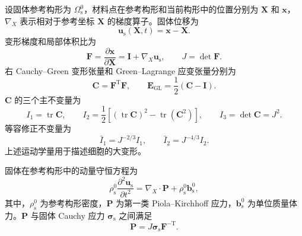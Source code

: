 设固体参考构形为 $\Omega_{\mathrm s}^0$，材料点在参考构形和当前构形中的位置分别为 $\boldsymbol{X}$ 和 $\boldsymbol{x}$，$\nabla_{\!X}$ 表示相对于参考坐标 $\boldsymbol{X}$ 的梯度算子。固体位移为
\begin{equation}
\boldsymbol{u}_{\mathrm s}(\boldsymbol{X},t)
=
\boldsymbol{x}-\boldsymbol{X}.
\label{eq:ch2_solid_motion}
\end{equation}
变形梯度和局部体积比为
\begin{equation}
\boldsymbol{F}
=
\frac{\partial\boldsymbol{x}}{\partial\boldsymbol{X}}
=
\boldsymbol{I}
+
\nabla_{\!X}\boldsymbol{u}_{\mathrm s},
\qquad
J=\det\boldsymbol{F}.
\label{eq:ch2_deformation_gradient}
\end{equation}
右 Cauchy--Green 变形张量和 Green--Lagrange 应变张量分别为
\begin{equation}
\boldsymbol{C}
=
\boldsymbol{F}^{\mathrm T}\boldsymbol{F},
\qquad
\boldsymbol{E}_{\mathrm{GL}}
=
\frac{1}{2}\left(\boldsymbol{C}-\boldsymbol{I}\right).
\label{eq:ch2_strain_tensors}
\end{equation}
$\boldsymbol{C}$ 的三个主不变量为
\begin{equation}
I_1=\operatorname{tr}\boldsymbol{C},
\qquad
I_2=
\frac{1}{2}
\left[
\left(\operatorname{tr}\boldsymbol{C}\right)^2
-
\operatorname{tr}\left(\boldsymbol{C}^2\right)
\right],
\qquad
I_3=\det\boldsymbol{C}=J^2.
\label{eq:ch2_invariants}
\end{equation}
等容修正不变量为
\begin{equation}
\bar I_1=J^{-2/3}I_1,
\qquad
\bar I_2=J^{-4/3}I_2.
\label{eq:ch2_modified_invariants}
\end{equation}
上述运动学量用于描述细胞的大变形\cite{holzapfel2000nonlinear,ogden1997nonlinear,bonet2008nonlinear}。

固体在参考构形中的动量守恒方程为
\begin{equation}
\rho_{\mathrm s}^0
\frac{\partial^2\boldsymbol{u}_{\mathrm s}}{\partial t^2}
=
\nabla_{\!X}\cdot\boldsymbol{P}
+
\rho_{\mathrm s}^0\boldsymbol{b}_{\mathrm s}^0,
\label{eq:ch2_solid_momentum_reference}
\end{equation}
其中，$\rho_{\mathrm s}^0$ 为参考构形密度，$\boldsymbol{P}$ 为第一类 Piola--Kirchhoff 应力，$\boldsymbol{b}_{\mathrm s}^0$ 为单位质量体力。$\boldsymbol{P}$ 与固体 Cauchy 应力 $\boldsymbol{\sigma}_{\mathrm s}$ 之间满足
\begin{equation}
\boldsymbol{P}
=
J\boldsymbol{\sigma}_{\mathrm s}\boldsymbol{F}^{-\mathrm T}.
\label{eq:ch2_stress_transform}
\end{equation}

